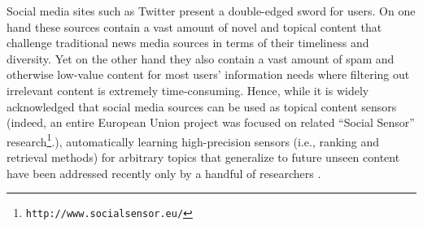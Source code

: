 



\label{sec:introduction}
Social media sites such as Twitter present a double-edged sword for
users.  On one hand these sources contain a vast amount of novel and
topical content that challenge traditional news media sources in terms
of their timeliness and diversity.  Yet on the other hand they also
contain a vast amount of spam and otherwise low-value content for most
users' information needs where filtering out irrelevant content is
extremely time-consuming.  Hence, while it is widely acknowledged that
social media sources can be used as topical content sensors (indeed,
an entire European Union project was focused on related ``Social Sensor''
research\footnote{\texttt{http://www.socialsensor.eu/}}.),
automatically learning high-precision sensors (i.e., ranking and
retrieval methods) for arbitrary topics that generalize to future
unseen content have been addressed recently only by a handful of researchers \citep{lin2011smoothing,yang2014large,magdy}.


